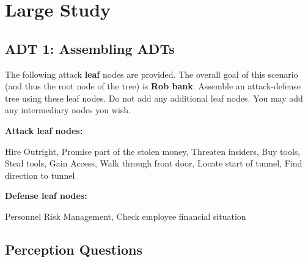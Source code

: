 \footnotesize

\section{Large Study}\label{sec:large-study-q}

\subsection{ADT 1: Assembling ADTs}

The following attack \textbf{leaf} nodes are provided. The overall goal of this scenario (and thus the root node of the tree) is \textbf{Rob bank}. Assemble an attack-defense tree using these leaf nodes. Do not add any additional leaf nodes. You may add any intermediary nodes you wish.

\textbf{Attack leaf nodes:}


Hire Outright, Promise part of the stolen money, Threaten insiders, Buy tools, Steal tools, Gain Access, Walk through front door, Locate start of tunnel, Find direction to tunnel

\textbf{Defense leaf nodes:}

Personnel Risk Management, Check employee financial situation


\subsection*{Perception Questions}


